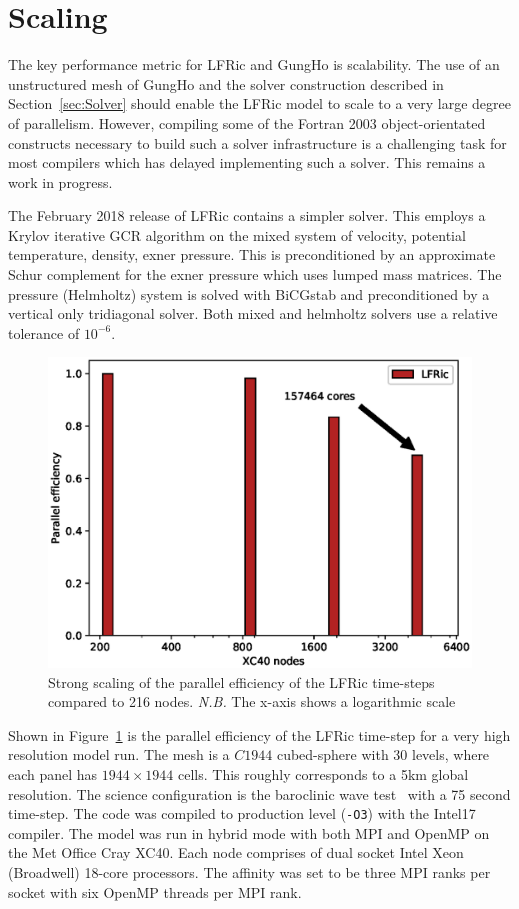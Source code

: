 \documentclass[review,times]{elsarticle}
\begin{document}
\section{\label{sec:scal}Scaling}
The key performance metric for
LFRic and GungHo is scalability. The use of an unstructured mesh of
GungHo and the solver construction described in
Section~\ref{sec:Solver} should enable the LFRic model to scale to a
very large degree of parallelism. However, compiling some of the
Fortran 2003 object-orientated constructs necessary to build such a solver
infrastructure is a challenging task for most compilers which has
delayed implementing such a solver. This remains a work in progress.

The February 2018 release of LFRic contains a simpler
solver. This employs a Krylov iterative GCR algorithm on the mixed
system of velocity, potential temperature, density, exner
pressure. This is preconditioned by an approximate Schur complement
for the exner pressure which uses lumped mass matrices. The pressure
(Helmholtz) system is solved with BiCGstab and preconditioned by a
vertical only tridiagonal solver. Both mixed and helmholtz solvers use
a relative tolerance of $10^{-6}$.

\begin{figure}
  \begin{center}
    \includegraphics[width=0.85\linewidth]{Fig7_scale.eps}
    \caption{\label{fig:scale_PE}Strong scaling of the parallel efficiency of the LFRic 
      time-steps compared to 216 nodes. {\em N.B.} The x-axis shows a
      logarithmic scale}
  \end{center}
\end{figure}

Shown in Figure~\ref{fig:scale_PE} is 
the parallel efficiency of the LFRic time-step for a very high 
resolution model run. The mesh is a $C1944$ cubed-sphere with 30 
levels, where each panel has $1944 \times 1944$ cells. This roughly corresponds 
to a 5km global resolution. The science configuration is the baroclinic wave 
test~\cite{qj.2241} with a 75 second time-step. The code was compiled 
to production level (\verb+-O3+) with the Intel17 compiler. The model 
was run in hybrid mode with both MPI and OpenMP on the Met Office Cray 
XC40. Each node comprises of dual socket Intel Xeon (Broadwell) 
18-core processors. The affinity was set to be three MPI ranks per 
socket with six OpenMP threads per MPI rank. 
\end{document}

